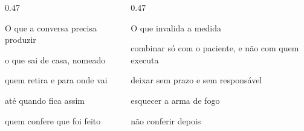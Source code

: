 
\begin{frame}{}
\begin{center}
\end{center}

\CRvg
\begin{columns}[onlytextwidth, t]
\begin{column}{0.47\textwidth}
\begin{caixaproteger}{O que a conversa precisa produzir}
\begin{itemc}
\item o que sai de casa, nomeado
\item quem retira e para onde vai
\item at\'e quando fica assim
\item quem confere que foi feito
\end{itemc}
\end{caixaproteger}
\end{column}
\calha
\begin{column}{0.47\textwidth}
\begin{caixaagir}{O que invalida a medida}
\begin{itemc}
\item combinar s\'o com o paciente, e n\~ao com quem executa
\item deixar sem prazo e sem respons\'avel
\item esquecer a arma de fogo
\item n\~ao conferir depois
\end{itemc}
\end{caixaagir}
\end{column}
\end{columns}
\end{frame}

